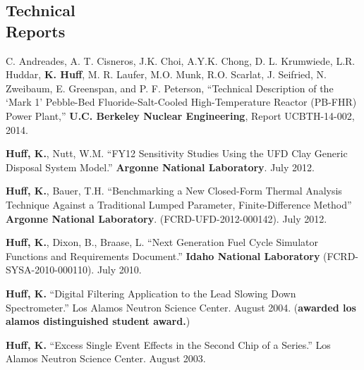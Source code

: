 \documentclass[margin,line]{resume}
\begin{document}
\begin{resume}
    \section{\mysidestyle Technical\\Reports}
    \begin{bibenum}
      \item C. Andreades, A. T. Cisneros, J.K. Choi, A.Y.K. Chong, D. L.
      Krumwiede, L.R. Huddar, \textbf{K. Huff}, M. R. Laufer, M.O. Munk, R.O.
      Scarlat, J. Seifried, N. Zweibaum, E. Greenspan, and P. F. Peterson,
      ``Technical Description of the ‘Mark 1’ Pebble-Bed Fluoride-Salt-Cooled
      High-Temperature Reactor (PB-FHR) Power Plant,'' \textbf{U.C. Berkeley Nuclear
      Engineering}, Report UCBTH-14-002, 2014.
      \item \textbf{Huff, K.}, Nutt, W.M. ``FY12 Sensitivity Studies Using the UFD Clay Generic Disposal System Model.''
        \textbf{Argonne National Laboratory}. July 2012.
      \item \textbf{Huff, K.}, Bauer, T.H. ``Benchmarking a New Closed-Form Thermal Analysis Technique Against a Traditional
        Lumped Parameter, Finite-Difference Method'' \textbf{Argonne National Laboratory}. (FCRD-UFD-2012-000142). July 2012.
      \item \textbf{Huff, K.}, Dixon, B., Braase, L. ``Next Generation Fuel Cycle Simulator Functions and Requirements Document.''
        \textbf{Idaho National Laboratory} (FCRD-SYSA-2010-000110). July 2010.
      \item \textbf{Huff, K.} ``Digital Filtering Application to the Lead Slowing Down
        Spectrometer.'' Los Alamos Neutron Science Center. August 2004.  %
        (\textbf{awarded los alamos distinguished student award.})
      \item \textbf{Huff, K.} ``Excess Single Event Effects in the Second Chip of a Series.''
        Los Alamos Neutron Science Center. August 2003.
    \end{bibenum}

\end{resume}
\end{document}
